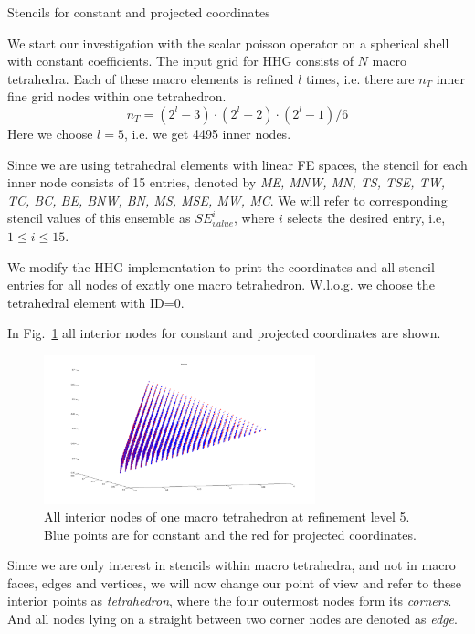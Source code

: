 \documentclass[a4paper,11pt,reqno]{amsart}
\numberwithin{figure}{section}
\numberwithin{table}{section}
\numberwithin{figure}{section}
\def\si{SE_{value}^i}
\begin{document}
\begin{section}{Stencils for constant and projected coordinates}

We start our investigation with the scalar poisson operator on a spherical
shell with constant coefficients. 
The input grid for HHG consists of $N$ macro tetrahedra. Each of these
macro elements is refined $l$ times, i.e. there are $n_T$ inner fine grid nodes
within one tetrahedron.
\begin{equation}
n_T = \left(2^l - 3\right)\cdot\left(2^l - 2\right)\cdot\left(2^l - 1\right)/6
\end{equation}
Here we choose $l=5$, i.e. we get 4495 inner nodes.

Since we are using tetrahedral elements with linear FE spaces, the stencil
for each inner node consists of 15 entries,  denoted by
\emph{ME, MNW, MN, TS, TSE, TW, TC, BC, BE, BNW, BN, MS, MSE, MW, MC}.
We will refer to corresponding stencil values of this ensemble as 
$\si$, where $i$ selects the desired
entry, i.e, $1 \leq i \leq 15$.

We modify the HHG implementation to print the coordinates and all stencil entries
for all nodes of exatly one macro tetrahedron. W.l.o.g. we choose the tetrahedral
element with ID=0.

In Fig.~\ref{fig:tet0Nodes} all interior nodes for constant and projected coordinates
are shown.

\begin{figure}\centering
\includegraphics[width=0.7\textwidth]{pics/tetInnerNodes} 
\caption{All interior nodes of one macro tetrahedron at refinement level 5.
Blue points are for constant and the red for projected coordinates.}
\label{fig:tet0Nodes}
\end{figure}   

Since we are only interest in stencils within macro tetrahedra, and not in macro faces,
edges and vertices, we will now change our point of view and refer to these interior points
as \emph{tetrahedron}, where the four outermost nodes form its \emph{corners}. 
And all nodes lying on a straight between two corner nodes are denoted as \emph{edge}.



\end{section}
\end{document}
